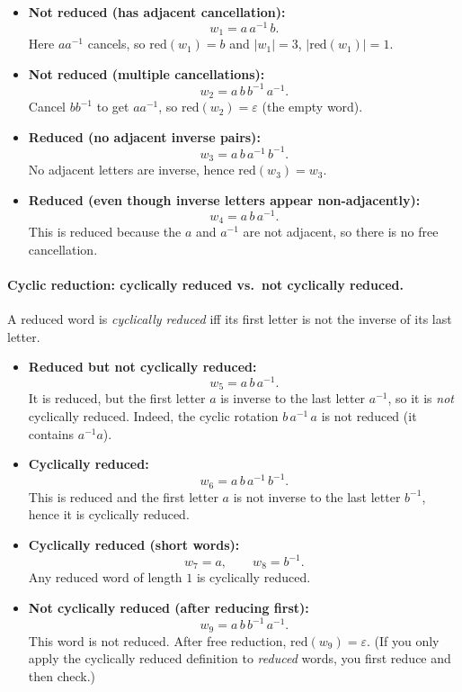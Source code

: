 \documentclass[11pt]{article}
\theoremstyle{definition}
\theoremstyle{plain}
\theoremstyle{remark}
\begin{document}
\begin{itemize}[leftmargin=2em]
\item \textbf{Not reduced (has adjacent cancellation):}
\[
w_1 = a\,a^{-1}\,b.
\]
Here $a a^{-1}$ cancels, so $\mathrm{red}(w_1)=b$ and $|w_1|=3$, $|\mathrm{red}(w_1)|=1$.

\item \textbf{Not reduced (multiple cancellations):}
\[
w_2 = a\,b\,b^{-1}\,a^{-1}.
\]
Cancel $b b^{-1}$ to get $a a^{-1}$, so $\mathrm{red}(w_2)=\varepsilon$ (the empty word).

\item \textbf{Reduced (no adjacent inverse pairs):}
\[
w_3 = a\,b\,a^{-1}\,b^{-1}.
\]
No adjacent letters are inverse, hence $\mathrm{red}(w_3)=w_3$.

\item \textbf{Reduced (even though inverse letters appear non-adjacently):}
\[
w_4 = a\,b\,a^{-1}.
\]
This is reduced because the $a$ and $a^{-1}$ are not adjacent, so there is no free cancellation.
\end{itemize}

\paragraph{Cyclic reduction: cyclically reduced vs.\ not cyclically reduced.}
A reduced word is \emph{cyclically reduced} iff its first letter is not the inverse of its last letter.

\begin{itemize}[leftmargin=2em]
\item \textbf{Reduced but not cyclically reduced:}
\[
w_5 = a\,b\,a^{-1}.
\]
It is reduced, but the first letter $a$ is inverse to the last letter $a^{-1}$, so it is \emph{not} cyclically reduced.
Indeed, the cyclic rotation $b\,a^{-1}\,a$ is not reduced (it contains $a^{-1}a$).

\item \textbf{Cyclically reduced:}
\[
w_6 = a\,b\,a^{-1}\,b^{-1}.
\]
This is reduced and the first letter $a$ is not inverse to the last letter $b^{-1}$, hence it is cyclically reduced.

\item \textbf{Cyclically reduced (short words):}
\[
w_7 = a,\qquad w_8=b^{-1}.
\]
Any reduced word of length $1$ is cyclically reduced.

\item \textbf{Not cyclically reduced (after reducing first):}
\[
w_9 = a\,b\,b^{-1}\,a^{-1}.
\]
This word is not reduced. After free reduction, $\mathrm{red}(w_9)=\varepsilon$.
(If you only apply the cyclically reduced definition to \emph{reduced} words, you first reduce and then check.)
\end{itemize}
\end{document}
